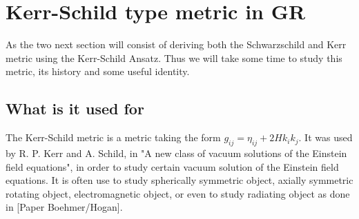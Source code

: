 \documentclass[a4paper,12pt]{article}
\theoremstyle{definition}
\begin{document}
\section{Kerr-Schild type metric in GR}
As the two next section will consist of deriving both the Schwarzschild and Kerr metric using the Kerr-Schild Ansatz.
Thus we will take some time to study this metric, its history and some useful identity.
\subsection{What is it used for}
The Kerr-Schild metric is a metric taking the form $g_{ij}=\eta_{ij}+2Hk_ik_j$. It was used by R. P. Kerr and A. Schild, in "A new class of vacuum solutions of the Einstein field equations", in order to study certain vacuum solution of the Einstein field equations.
It is often use to study spherically symmetric object, axially symmetric rotating object, electromagnetic object, or even to study radiating object as done in [Paper Boehmer/Hogan].
\end{document}
